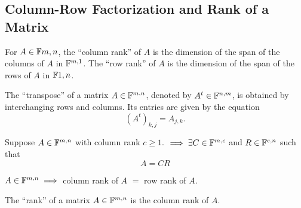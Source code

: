 \subsection{Column-Row Factorization and Rank of a Matrix}

\setcounter{thm}{51}
\begin{mydef}
  For $A \in \mathbb{F}{m,n}$, the ``column rank'' of $A$ is the dimension of the span of the columns of $A$ in $\mathbb{F}^{m,1}$. The ``row rank'' of $A$ is the dimension of the span of the rows of $A$ in $\mathbb{F}{1,n}$.
\end{mydef}

\setcounter{thm}{53}
\begin{mydef}
  The ``transpose'' of a matrix $A\in \mathbb{F}^{m,n}$, denoted by $A^t\in \mathbb{F}^{n,m}$, is obtained by interchanging rows and columns. Its entries are given by the equation
  \begin{equation}
    \left( A^{t} \right)_{k,j} = A_{j,k}.
  \end{equation}
\end{mydef}

\setcounter{thm}{55}
\begin{thm}
  Suppose $A \in \mathbb{F}^{m,n}$ with column rank $c \geq 1.$ $\implies \exists C\in \mathbb{F}^{m,c}$ and $R\in \mathbb{F}^{c,n}$ such that
  \begin{equation}
    A = CR
  \end{equation}
\end{thm}

\begin{thm}
  $A\in \mathbb{F}^{m,n} \implies$ column rank of $A$ $=$ row rank of $A$.
\end{thm}

\begin{mydef} [rank]
  The ``rank'' of a matrix $A \in  \mathbb{F}^{m,n}$ is the column rank of $A$.
\end{mydef}